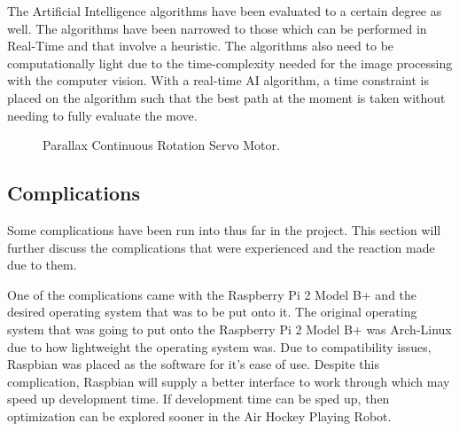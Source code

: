 \documentclass[letterpaper, 10 pt, conference]{ieeeconf}
\begin{document}
The Artificial Intelligence algorithms have been evaluated to a certain degree as well. The algorithms have been narrowed to those which can be performed in Real-Time and that involve a heuristic. The algorithms also need to be computationally light due to the time-complexity needed for the image processing with the computer vision.  With a real-time AI algorithm, a time constraint is placed on the algorithm such that the best path at the moment is taken without needing to fully evaluate the move.

\begin{figure}[!h]
\centering
{}
\caption{Parallax Continuous Rotation Servo Motor.}
\label{servo}
\end{figure}

\subsection{Complications}

Some complications have been run into thus far in the project.  This section will further discuss the complications that were experienced and the reaction made due to them.  

One of the complications came with the Raspberry Pi 2 Model B+ and the desired operating system that was to be put onto it.  The original operating system that was going to put onto the Raspberry Pi 2 Model B+ was Arch-Linux due to how lightweight the operating system was.  Due to compatibility issues, Raspbian was placed as the software for it's ease of use.  Despite this complication, Raspbian will supply a better interface to work through which may speed up development time.  If development time can be sped up, then optimization can be explored sooner in the Air Hockey Playing Robot.  
\end{document}
